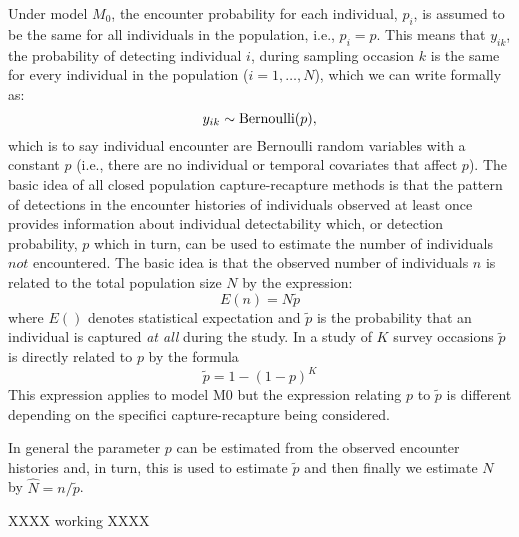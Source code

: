 \documentclass{book}
\begin{document}
Under model $M_0$, the encounter probability for each individual,
$p_i$, is assumed to be the same for all individuals in the
population, i.e., $p_i = p$. This means that $y_{ik}$, the probability
of detecting individual $i$, during sampling occasion $k$ is the same
for every individual in the population ($i = 1,\ldots,N$), which we
can write formally as:
\[
y_{ik} \sim \hbox{Bernoulli}(p),
\]
which is to say individual encounter are Bernoulli random variables
with a constant $p$ (i.e., there are no individual or temporal
covariates that affect $p$). The basic idea of all closed population
capture-recapture methods  is that the pattern of
detections in the encounter histories of individuals observed at least
once provides information about individual detectability which, or
detection probability, $p$ which in
turn, can be used to estimate the number of individuals $not$
encountered.  The basic idea is that the observed number of
individuals $n$ is related to the total population size $N$ by the
expression:
\[
 E(n) = N\tilde{p}
\]
where $E()$ denotes statistical expectation and $\tilde{p}$ is the
probability that an individual is captured {\it at all} during the
study. In a study of $K$ survey occasions $\tilde{p}$ is directly
related to $p$ by the formula
\[
 \tilde{p} = 1-(1-p)^K
\]
This expression applies to model M0 but the
 expression relating $p$ to $\tilde{p}$ is different depending on
the specifici  capture-recapture being considered.

In general the parameter $p$ can be estimated from the observed
encounter histories and, in turn, this is used to estimate $\tilde{p}$
and then finally we estimate $N$ by $\hat{N} = n/\tilde{p}$.

XXXX working XXXX
\end{document}
